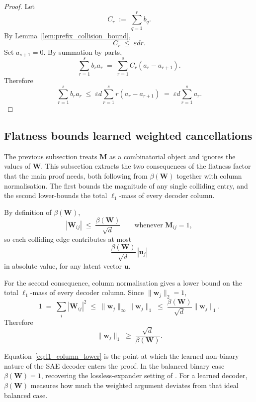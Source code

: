 \documentclass{article}
\theoremstyle{plain}
\theoremstyle{definition}
\theoremstyle{remark}
\begin{document}
\begin{proof}
Let
\[
    C_r \;:=\; \sum_{q=1}^r b_q.
\]
By Lemma~\ref{lem:prefix_collision_bound},
\[
    C_r \;\le\; \varepsilon d r.
\]
Set $a_{s+1} = 0$. By summation by parts,
\[
    \sum_{r=1}^s b_r a_r
    \;=\;
    \sum_{r=1}^s C_r (a_r - a_{r+1}).
\]
Therefore
\[
    \sum_{r=1}^s b_r a_r
    \;\le\;
    \varepsilon d
    \sum_{r=1}^s r (a_r - a_{r+1})
    \;=\;
    \varepsilon d
    \sum_{r=1}^s a_r.
\]
\end{proof}

\subsection{Flatness bounds learned weighted cancellations}

The previous subsection treats $\mathbf{M}$ as a combinatorial object and ignores the values of $\mathbf{W}$. This subsection extracts the two consequences of the flatness factor that the main proof needs, both following from $\beta(\mathbf{W})$ together with column normalisation. The first bounds the magnitude of any single colliding entry, and the second lower-bounds the total $\ell_1$-mass of every decoder column.

By definition of $\beta(\mathbf{W})$,
\[
    |\mathbf{W}_{ij}|
    \;\le\;
    \frac{\beta(\mathbf{W})}{\sqrt{d}}
    \qquad
    \text{whenever } \mathbf{M}_{ij} = 1,
\]
so each colliding edge contributes at most
\[
    \frac{\beta(\mathbf{W})}{\sqrt{d}}\,|\mathbf{u}_j|
\]
in absolute value, for any latent vector $\mathbf{u}$.

For the second consequence, column normalisation gives a lower bound on the total $\ell_1$-mass of every decoder column. Since $\|\mathbf{w}_j\|_2 = 1$,
\[
    1
    \;=\;
    \sum_i |\mathbf{W}_{ij}|^2
    \;\le\;
    \|\mathbf{w}_j\|_\infty \|\mathbf{w}_j\|_1
    \;\le\;
    \frac{\beta(\mathbf{W})}{\sqrt{d}}\|\mathbf{w}_j\|_1.
\]
Therefore
\begin{equation}
\label{eq:l1_column_lower}
    \|\mathbf{w}_j\|_1
    \;\ge\;
    \frac{\sqrt{d}}{\beta(\mathbf{W})}.
\end{equation}

Equation~\eqref{eq:l1_column_lower} is the point at which the learned non-binary nature of the SAE decoder enters the proof. In the balanced binary case $\beta(\mathbf{W}) = 1$, recovering the lossless-expander setting of \citet{jafarpour2009efficient}. For a learned decoder, $\beta(\mathbf{W})$ measures how much the weighted argument deviates from that ideal balanced case.
\end{document}
